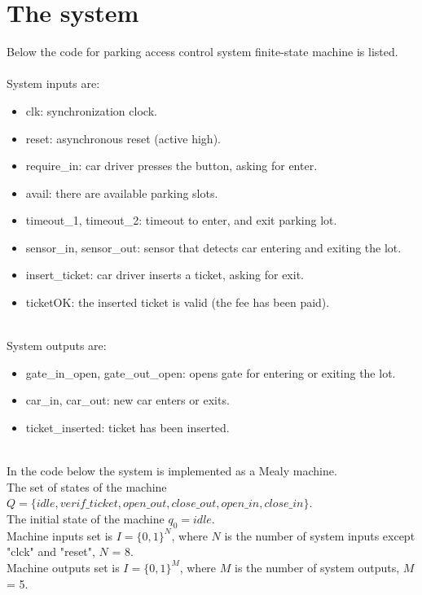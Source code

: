 \documentclass{article}
\begin{document}
	\graphicspath{{../../misc/uga-titles/}}
	\graphicspath{{./}}
	
	\section*{The system}
	Below the code for parking access control system finite-state machine is listed. \\
	\ \\
	System inputs are:
	\begin{itemize}[nosep]
		\item clk: synchronization clock.
		\item reset: asynchronous reset (active high).
		\item require\_in: car driver presses the button, asking for enter.
		\item avail: there are available parking slots.
		\item timeout\_1, timeout\_2: timeout to enter, and exit parking lot.
		\item sensor\_in, sensor\_out: sensor that detects car entering and exiting the lot.
		\item insert\_ticket: car driver inserts a ticket, asking for exit.
		\item ticketOK: the inserted ticket is valid (the fee has been paid).
	\end{itemize}
	\ \\
	System outputs are:
	\begin{itemize}[nosep]
		\item gate\_in\_open, gate\_out\_open: opens gate for entering or exiting the lot.
		\item car\_in, car\_out: new car enters or exits.
		\item ticket\_inserted: ticket has been inserted.
	\end{itemize}
	\ \\
	In the code below the system is implemented as a Mealy machine.\\
	The set of states of the machine $Q = \{idle, verif\_ticket, open\_out, close\_out, open\_in, close\_in\}$. \\
	The initial state of the machine $q_0 = idle$. \\
	Machine inputs set is $I = \{0, 1\}^N$, where $N$ is the number of system inputs except "clck" and "reset", $N$ = 8. \\
	Machine outputs set is $I = \{0, 1\}^M$, where $M$ is the number of system outputs, $M$ = 5. \\
\end{document}
